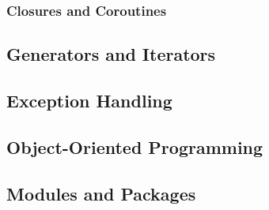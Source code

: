 \subsubsection{Closures and Coroutines}
\label{closures}

\subsection{Generators and Iterators}

\subsection{Exception Handling}

\subsection{Object-Oriented Programming}
\label{oop}

\subsection{Modules and Packages}
